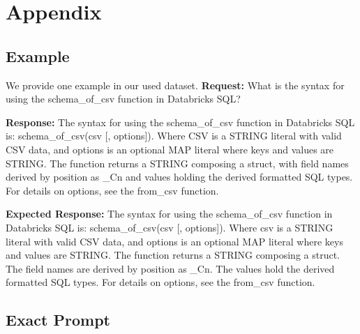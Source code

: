 \newpage
\section{Appendix}

\subsection{Example }

We provide one example in our used dataset.
\textbf{Request:} What is the syntax for using the schema\_of\_csv function in Databricks SQL?

\textbf{Response:} The syntax for using the schema\_of\_csv function in Databricks SQL is:
schema\_of\_csv(csv [, options]). Where CSV is a STRING literal with valid CSV data, and options is an optional MAP literal where keys and values are STRING. The function returns a STRING composing a struct, with field names derived by position as \_Cn and values holding the derived formatted SQL types. For details on options, see the from\_csv function.

\textbf{Expected Response:} The syntax for using the schema\_of\_csv function in Databricks SQL is:
schema\_of\_csv(csv [, options]).
Where csv is a STRING literal with valid CSV data, and options is an optional MAP literal where keys and values are STRING. The function returns a STRING composing a struct. The field names are derived by position as \_Cn. The values hold the derived formatted SQL types. For details on options, see the from\_csv function.


\subsection{Exact Prompt }

